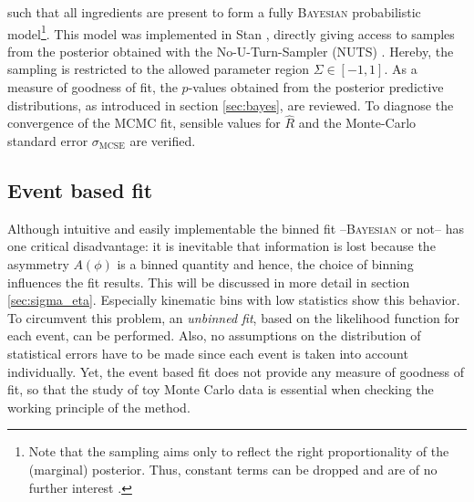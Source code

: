 such that all ingredients are present to form a fully \textsc{Bayesian} probabilistic model\footnote{Note that the sampling aims only to reflect the right proportionality of the (marginal) posterior. Thus, constant terms can be dropped and are of no further interest \cite{stan}.}. This model was implemented in Stan \cite{stan}, directly giving access to samples from the posterior obtained with the No-U-Turn-Sampler (NUTS) \cite{stan,nuts}. Hereby, the sampling is restricted to the allowed parameter region $\Sigma\in[-1,1]$. As a measure of goodness of fit, the $p$-values obtained from the posterior predictive distributions, as introduced in section \ref{sec:bayes}, are reviewed. To diagnose the convergence of the MCMC fit, sensible values for $\hat{R}$ and the Monte-Carlo standard error $\sigma_\text{MCSE}$ are verified.
\subsection{Event based fit}
Although intuitive and easily implementable the binned fit --\textsc{Bayesian} or not-- has one critical disadvantage: it is inevitable that information is lost because the asymmetry $A(\phi)$ is a binned quantity and hence, the choice of binning influences the fit results. This will be discussed in more detail in section \ref{sec:sigma_eta}. Especially kinematic bins with low statistics show this behavior. To circumvent this problem, an \emph{unbinned fit}, based on the likelihood function for each event, can be performed. Also, no assumptions on the distribution of statistical errors have to be made since each event is taken into account individually. Yet, the event based fit does not provide any measure of goodness of fit, so that the study of toy Monte Carlo data is essential when checking the working principle of the method.

